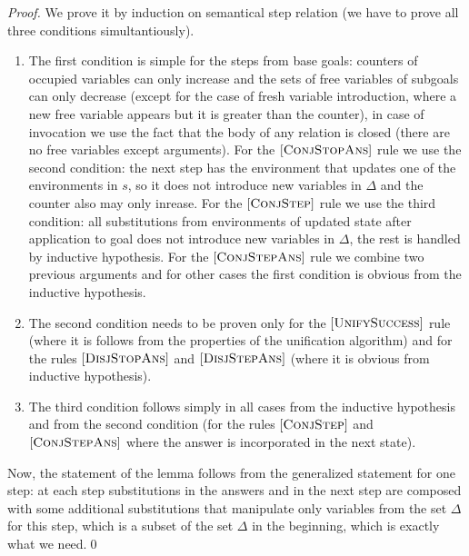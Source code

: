 \begin{proof}
We prove it by induction on semantical step relation (we have to prove all three conditions simultantiously).

\begin{enumerate}
\item The first condition is simple for the steps from base goals: counters of occupied variables can only increase and the sets of free variables of subgoals can only decrease (except for the case of fresh variable introduction, where a new free variable appears but it is greater than the counter), in case of invocation we use the fact that the body of any relation is closed (there are no free variables except arguments). For the $\mbox{[\textsc{ConjStopAns}]}$ rule we use the second condition: the next step has the environment that updates one of the environments in $s$, so it does not introduce new variables in $\Delta$ and the counter also may only inrease. For the $\mbox{[\textsc{ConjStep}]}$ rule we use the third condition: all substitutions from environments of updated state after application to goal does not introduce new variables in $\Delta$, the rest is handled by inductive hypothesis. For the $\mbox{[\textsc{ConjStepAns}]}$ rule we combine two previous arguments and for other cases the first condition is obvious from the inductive hypothesis.

\item The second condition needs to be proven only for the $\mbox{[\textsc{UnifySuccess}]}$ rule (where it is follows from the properties of the unification algorithm) and for the rules $\mbox{[\textsc{DisjStopAns}]}$ and $\mbox{[\textsc{DisjStepAns}]}$ (where it is obvious from inductive hypothesis).

\item The third condition follows simply in all cases from the inductive hypothesis and from the second condition (for the rules $\mbox{[\textsc{ConjStep}]}$ and $\mbox{[\textsc{ConjStepAns}]}$ where the answer is incorporated in the next state).
\end{enumerate}

Now, the statement of the lemma follows from the generalized statement for one step: at each step substitutions in the answers and in the next step are composed with some additional substitutions that manipulate only variables from the set $\Delta$ for this step, which is a subset of the set $\Delta$ in the beginning, which is exactly what we need.\qed

\end{proof}

